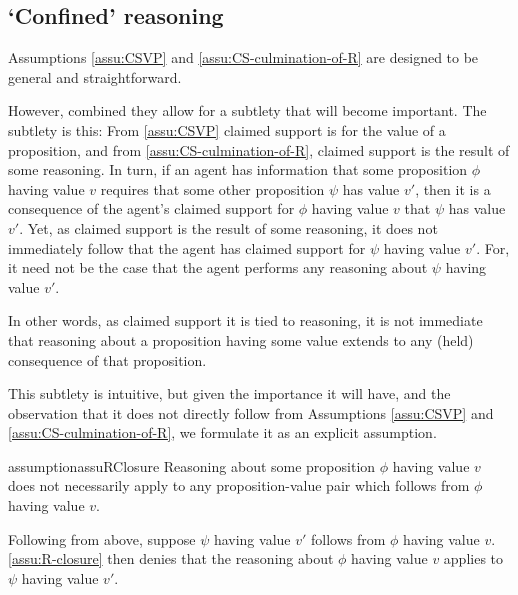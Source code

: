 \subsection{`Confined' reasoning}
\label{sec:no-closure}

\begin{note}
  Assumptions \ref{assu:CSVP} and \ref{assu:CS-culmination-of-R} are designed to be general and straightforward.

  However, combined they allow for a subtlety that will become important.
  The subtlety is this:
  From \autoref{assu:CSVP} claimed support is for the value of a proposition, and from \autoref{assu:CS-culmination-of-R}, claimed support is the result of some reasoning.
  In turn, if an agent has information that some proposition \(\phi\) having value \(v\) requires that some other proposition \(\psi\) has value \(v'\), then it is a consequence of the agent's claimed support for \(\phi\) having value \(v\) that \(\psi\) has value \(v'\).
  Yet, as claimed support is the result of some reasoning, it does not immediately follow that the agent has claimed support for \(\psi\) having value \(v'\).
  For, it need not be the case that the agent performs any reasoning about \(\psi\) having value \(v'\).

  In other words, as claimed support it is tied to reasoning, it is not immediate that reasoning about a proposition having some value extends to any (held) consequence of that proposition.

  This subtlety is intuitive, but given the importance it will have, and the observation that it does not directly follow from Assumptions \ref{assu:CSVP} and \ref{assu:CS-culmination-of-R}, we formulate it as an explicit assumption.
\end{note}

\begin{note}
  \begin{restatable}{assumption}{assuRClosure}
    \label{assu:R-closure}
    Reasoning about some proposition \(\phi\) having value \(v\) does not necessarily apply to any proposition-value pair which follows from \(\phi\) having value \(v\).
  \end{restatable}

  Following from above, suppose \(\psi\) having value \(v'\) follows from \(\phi\) having value \(v\).
  \autoref{assu:R-closure} then denies that the reasoning about \(\phi\) having value \(v\) applies to \(\psi\) having value \(v'\).
\end{note}

